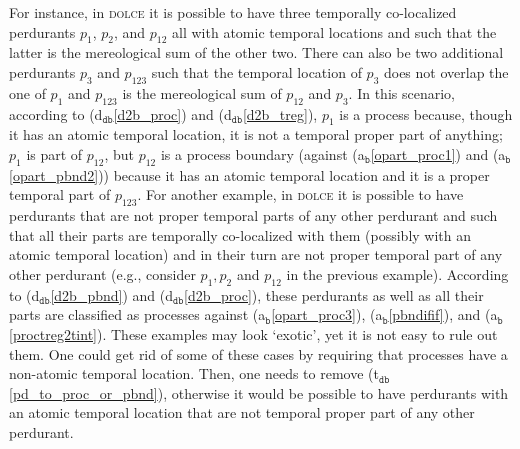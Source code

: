 \documentclass[ao]{iosart2x}
\newcommand{\nb}[1]{\textcolor{red}{$|$}\marginpar{\hspace*{-0cm}\parbox{20mm}{\scriptsize\raggedright\textcolor{red}{#1}}}}
\newcommand{\bfoAxLabel}{\textrm{a$_\texttt{b}$}}
\newcommand{\dbDefLabel}{\textrm{d$_\texttt{db}$}}
\newcommand{\dbThrLabel}{\textrm{t$_\texttt{db}$}}
\newcommand{\refbfoax}[1]{({\bfoAxLabel}\ref{#1})}
\newcommand{\refdbdf}[1]{({\dbDefLabel}\ref{#1})}
\newcommand{\refdbth}[1]{({\dbThrLabel}\ref{#1})}
\newcommand{\pr}[1]{\mathtt{#1}}
\newcommand{\dolce}{{\textsc{dolce}}}
\newcommand {\SUMd} {\ensuremath{\pr{SUM}}}
\begin{document}
For instance, in {\dolce} it is possible to have three temporally co-localized perdurants $p_1$, $p_2$, and $p_{12}$ all with atomic temporal locations and such that  the latter is the mereological sum of the other two. %
There can also be two additional perdurants $p_3$ and $p_{123}$ such that the temporal location of $p_3$ does not overlap the one of $p_1$ and $p_{123}$ is the mereological sum of $p_{12}$ and $p_{3}$. %
 In this scenario, according to \refdbdf{d2b_proc} and \refdbdf{d2b_treg}, $p_{1}$ is a process because, though it has an atomic temporal location, it is not a temporal proper part of anything; $p_1$ is part of $p_{12}$, but $p_{12}$ is a process boundary (against \refbfoax{opart_proc1} and \refbfoax{opart_pbnd2}) because it has an atomic temporal location and it is a proper temporal part of $p_{123}$. For another example, in {\dolce} it is possible to have perdurants that are not proper temporal parts of any other perdurant and such that all their parts are temporally co-localized with them (possibly with an atomic temporal location) and in their turn are not proper temporal part of any other perdurant (e.g., consider $p_1, p_2$ and $p_{12}$ in the previous example). %
 According to \refdbdf{d2b_pbnd} and \refdbdf{d2b_proc}, these perdurants as well as all their parts are classified as processes against \refbfoax{opart_proc3}, \refbfoax{pbndifif}, and \refbfoax{proctreg2tint}. These examples may look `exotic', yet it is not easy to rule out them. One could get rid of some of these cases by requiring that processes have a non-atomic temporal location. Then, one needs to remove \refdbth{pd_to_proc_or_pbnd}, otherwise it would be possible to have perdurants with an atomic temporal location that are not temporal proper part of any other perdurant. 
\end{document}
